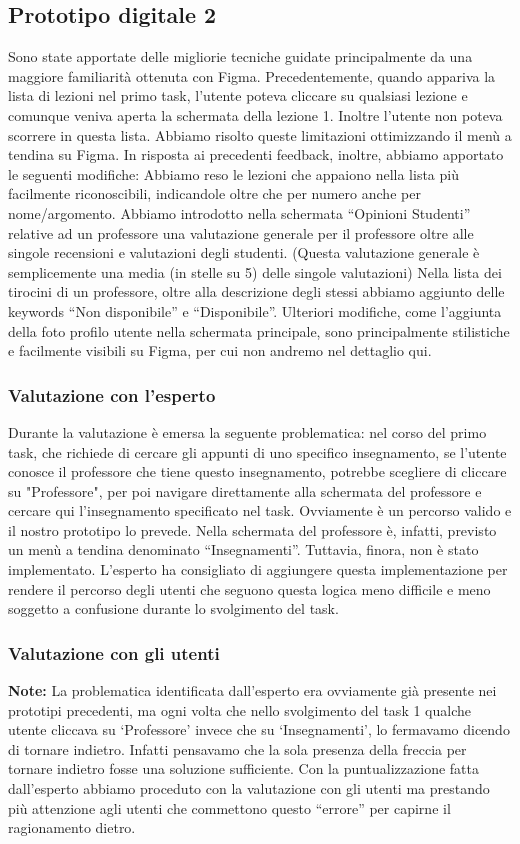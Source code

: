 \subsection{Prototipo digitale 2}
Sono state apportate delle migliorie tecniche guidate principalmente da una maggiore familiarità ottenuta con Figma.
Precedentemente, quando appariva la lista di lezioni nel primo task, l’utente poteva cliccare su qualsiasi lezione e comunque veniva aperta la schermata della lezione 1. Inoltre l’utente non poteva
scorrere in questa lista. Abbiamo risolto queste limitazioni ottimizzando il menù a tendina su Figma.
In risposta ai precedenti feedback, inoltre, abbiamo apportato le seguenti modifiche:
Abbiamo reso le lezioni che appaiono nella lista più facilmente riconoscibili, indicandole oltre che per numero anche per nome/argomento.
Abbiamo introdotto nella schermata “Opinioni Studenti” relative ad un professore una valutazione generale per il professore oltre alle singole recensioni e valutazioni degli studenti.
(Questa valutazione generale è semplicemente una media (in stelle su 5) delle singole valutazioni)
Nella lista dei tirocini di un professore, oltre alla descrizione degli stessi abbiamo aggiunto delle keywords “Non disponibile” e “Disponibile”.
Ulteriori modifiche, come l’aggiunta della foto profilo utente nella schermata principale, sono principalmente stilistiche e facilmente visibili su Figma, per cui non andremo nel dettaglio qui.

\subsubsection{Valutazione con l'esperto}
Durante la valutazione è emersa la seguente problematica: nel corso del primo task, che richiede di cercare gli appunti di uno specifico insegnamento, se l’utente conosce il professore che tiene questo
insegnamento, potrebbe scegliere di cliccare su "Professore", per poi navigare direttamente alla schermata del professore e cercare qui l’insegnamento specificato nel task.
Ovviamente è un percorso valido e il nostro prototipo lo prevede. Nella schermata del professore è, infatti, previsto un menù a tendina denominato “Insegnamenti”. Tuttavia, finora, non è stato implementato.
L’esperto ha consigliato di aggiungere questa implementazione per rendere il percorso degli utenti che seguono questa logica meno difficile e meno soggetto a confusione durante lo svolgimento del task.

\subsubsection{Valutazione con gli utenti}
\textbf{Note:} La problematica identificata dall’esperto era ovviamente già presente nei prototipi precedenti, ma ogni volta che nello svolgimento del task 1 qualche utente cliccava su ‘Professore’ invece che su ‘Insegnamenti’, lo fermavamo dicendo di tornare indietro.
Infatti pensavamo che la sola presenza della freccia per tornare indietro fosse una soluzione sufficiente. Con la puntualizzazione fatta dall’esperto abbiamo proceduto con la valutazione con gli utenti ma prestando più attenzione agli utenti che commettono questo “errore” per capirne il ragionamento dietro.

